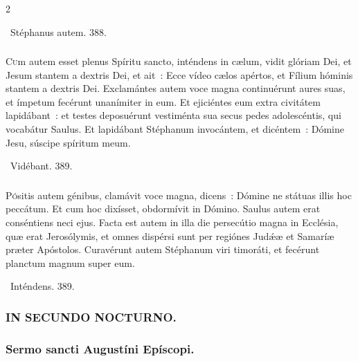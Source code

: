 \documentclass[9pt,twoside]{extarticle}
\begin{document}
\begin{multicols}{2}
\begin{tightlist}{}
\item {}~Stéphanus autem. 388.
\end{tightlist}

\subsubsection*{\center {}}
\lettrine{C}um autem esset plenus Spíritu sancto, inténdens in cælum, vidit glóriam Dei, et Jesum stantem a dextris Dei, et ait~: Ecce vídeo cælos apértos, et Fílium hóminis stantem a dextris Dei.
Exclamántes autem voce magna continuérunt aures suas, et ímpetum fecérunt unanímiter in eum.
Et ejiciéntes eum extra civitátem lapidábant~: et testes deposuérunt vestiménta sua secus pedes adolescéntis, qui vocabátur Saulus.
Et lapidábant Stéphanum invocántem, et dicéntem~: Dómine Jesu, súscipe spíritum meum.

\begin{tightlist}{}
\item {}~Vidébant. 389.
\end{tightlist}

\subsubsection*{\center {}}
\lettrine{P}ósitis autem génibus, clamávit voce magna, dicens~: Dómine ne státuas illis hoc peccátum. Et cum hoc dixísset, obdormívit in Dómino. Saulus autem erat conséntiens neci ejus.
Facta est autem in illa die persecútio magna in Ecclésia, quæ erat Jerosólymis, et omnes dispérsi sunt per regiónes Judǽæ et Samaríæ præter Apóstolos.
Curavérunt autem Stéphanum viri timoráti, et fecérunt planctum magnum super eum.

\begin{tightlist}{}
\item {}~Inténdens. 389.
\end{tightlist}

\subsubsection*{\center \textsc{IN SECUNDO NOCTURNO.}}
\subsubsection*{\center Sermo sancti Augustíni Epíscopi.}

\end{multicols}
\end{document}

